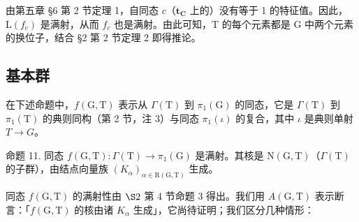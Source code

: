 由第五章 §6 第 2 节定理 1，自同态 \(c\)（\(\mathbf{t}_{\mathbf{C}}\) 上的）没有等于 1 的特征值。因此，\(\mathrm{L}(f_c)\) 是满射，从而 \(f_c\) 也是满射。由此可知，T 的每个元素都是 G 中两个元素的换位子，结合 §2 第 2 节定理 2 即得推论。

\subsection{基本群}

在下述命题中，\(f(\mathrm{G},\mathrm{T})\) 表示从 \(\varGamma(\mathrm{T})\) 到 \(\pi_{1}(\mathrm{G})\) 的同态，它是 \(\varGamma(\mathrm{T})\) 到 \(\pi_{1}(\mathrm{T})\) 的典则同构（第 2 节，注 3）与同态 \(\pi_{1}(\iota)\) 的复合，其中 \(\iota\) 是典则单射 \(T\to G\)。

命题 11. 同态 \(f(\mathrm{G},\mathrm{T}) : \Gamma(\mathrm{T}) \to \pi_1(\mathrm{G})\) 是满射。其核是 \(\mathrm{N}(\mathrm{G},\mathrm{T})\)（\(\Gamma(\mathrm{T})\) 的子群），由结点向量族 \((K_{\alpha})_{\alpha \in \mathrm{R}(\mathrm{G},\mathrm{T})}\) 生成。

同态 \(f(\mathrm{G},\mathrm{T})\) 的满射性由 \(\S2\) 第 4 节命题 3 得出。我们用 \(A(\mathrm{G},\mathrm{T})\) 表示断言：「\(f(\mathrm{G},\mathrm{T})\) 的核由诸 \(K_{\alpha}\) 生成」，它尚待证明；我们区分几种情形：


